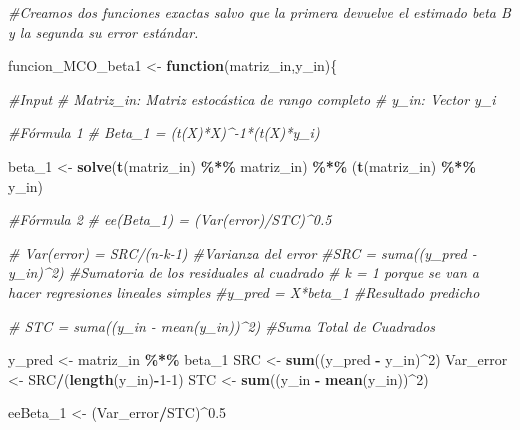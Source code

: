\documentclass[
]{article}
\newenvironment{Shaded}{\begin{snugshade}}{\end{snugshade}}
\newcommand{\CommentTok}[1]{\textcolor[rgb]{0.56,0.35,0.01}{\textit{#1}}}
\newcommand{\ControlFlowTok}[1]{\textcolor[rgb]{0.13,0.29,0.53}{\textbf{#1}}}
\newcommand{\DecValTok}[1]{\textcolor[rgb]{0.00,0.00,0.81}{#1}}
\newcommand{\FloatTok}[1]{\textcolor[rgb]{0.00,0.00,0.81}{#1}}
\newcommand{\FunctionTok}[1]{\textcolor[rgb]{0.13,0.29,0.53}{\textbf{#1}}}
\newcommand{\NormalTok}[1]{#1}
\newcommand{\OtherTok}[1]{\textcolor[rgb]{0.56,0.35,0.01}{#1}}
\newcommand{\SpecialCharTok}[1]{\textcolor[rgb]{0.81,0.36,0.00}{\textbf{#1}}}
\begin{document}
\begin{Shaded}
\begin{Highlighting}[]
\CommentTok{\#Creamos dos funciones exactas salvo que la primera devuelve el estimado beta B y la segunda su error estándar.}

\NormalTok{funcion\_MCO\_beta1 }\OtherTok{\textless{}{-}} \ControlFlowTok{function}\NormalTok{(matriz\_in,y\_in)\{}
  
  \CommentTok{\#Input}
    \CommentTok{\# Matriz\_in: Matriz estocástica de rango completo}
    \CommentTok{\# y\_in: Vector y\_i}
  
  \CommentTok{\#Fórmula 1}
    \CommentTok{\# Beta\_1 = (t(X)*X)\^{}{-}1*(t(X)*y\_i)}
    
\NormalTok{  beta\_1 }\OtherTok{\textless{}{-}} \FunctionTok{solve}\NormalTok{(}\FunctionTok{t}\NormalTok{(matriz\_in) }\SpecialCharTok{\%*\%}\NormalTok{ matriz\_in) }\SpecialCharTok{\%*\%} 
\NormalTok{              (}\FunctionTok{t}\NormalTok{(matriz\_in) }\SpecialCharTok{\%*\%}\NormalTok{   y\_in)}
  
  \CommentTok{\#Fórmula 2}
    \CommentTok{\# ee(Beta\_1) = (Var(error)/STC)\^{}0.5}
      
      \CommentTok{\# Var(error) = SRC/(n{-}k{-}1) \#Varianza del error}
        \CommentTok{\#SRC = suma((y\_pred {-} y\_in)\^{}2) \#Sumatoria de los residuales al cuadrado}
        \CommentTok{\# k = 1 porque se van a hacer regresiones lineales simples}
        \CommentTok{\#y\_pred = X*beta\_1 \#Resultado predicho}
      
      \CommentTok{\# STC = suma((y\_in {-} mean(y\_in))\^{}2) \#Suma Total de Cuadrados}
    
\NormalTok{    y\_pred }\OtherTok{\textless{}{-}}\NormalTok{ matriz\_in  }\SpecialCharTok{\%*\%}\NormalTok{ beta\_1}
\NormalTok{    SRC }\OtherTok{\textless{}{-}} \FunctionTok{sum}\NormalTok{((y\_pred }\SpecialCharTok{{-}}\NormalTok{ y\_in)}\SpecialCharTok{\^{}}\DecValTok{2}\NormalTok{)}
\NormalTok{    Var\_error }\OtherTok{\textless{}{-}}\NormalTok{ SRC}\SpecialCharTok{/}\NormalTok{(}\FunctionTok{length}\NormalTok{(y\_in)}\SpecialCharTok{{-}}\DecValTok{1{-}1}\NormalTok{)}
\NormalTok{    STC }\OtherTok{\textless{}{-}} \FunctionTok{sum}\NormalTok{((y\_in }\SpecialCharTok{{-}} \FunctionTok{mean}\NormalTok{(y\_in))}\SpecialCharTok{\^{}}\DecValTok{2}\NormalTok{)}
    
\NormalTok{    eeBeta\_1 }\OtherTok{\textless{}{-}}\NormalTok{ (Var\_error}\SpecialCharTok{/}\NormalTok{STC)}\SpecialCharTok{\^{}}\FloatTok{0.5}


\end{Highlighting}
\end{Shaded}
\end{document}
